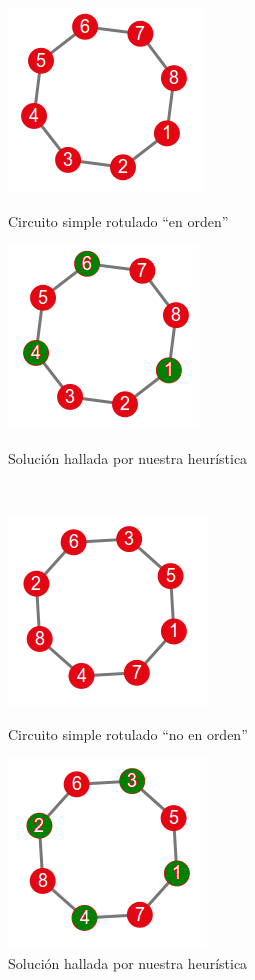 \begin{figure}[!htb]
\begin{center}
  \includegraphics[scale=0.8]{imagenes/faimilia2.png}
\end{center}
  \caption{Circuito simple rotulado ``en orden''}\label{fig:familia2}
\endminipage\hfill
{}
\begin{center}
  \includegraphics[scale=0.8]{imagenes/faimilia2-resopt.png}
\end{center}
  \caption{Solución hallada por nuestra heurística}\label{fig:familia2res}
\endminipage\\
\begin{center}
  \includegraphics[scale=0.8]{imagenes/faimilia2rename.png}
\end{center}
  \caption{Circuito simple rotulado ``no en orden''}\label{fig:familia2bis}
\endminipage\hfill
{}
\begin{center}
  \includegraphics[scale=0.8]{imagenes/faimilia2rename-solnoopt.png}
\end{center}
  \caption{Solución hallada por nuestra heurística}\label{fig:familia2bisres}
\endminipage
\end{figure}



